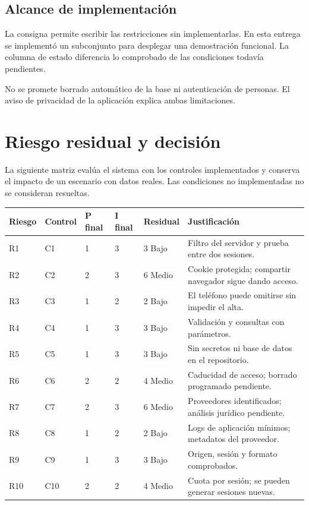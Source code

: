 \documentclass[11pt,a4paper]{article}
\begin{document}
\subsection{Alcance de implementación}
La consigna permite escribir las restricciones sin implementarlas. En esta entrega se implementó un subconjunto para desplegar una demostración funcional. La columna de estado diferencia lo comprobado de las condiciones todavía pendientes.

No se promete borrado automático de la base ni autenticación de personas. El aviso de privacidad de la aplicación explica ambas limitaciones.

\newpage
\section{Riesgo residual y decisión}
La siguiente matriz evalúa el sistema con los controles implementados y conserva el impacto de un escenario con datos reales. Las condiciones no implementadas no se consideran resueltas.

{\small
\begin{tabularx}{\textwidth}{@{}P{1cm}P{1.5cm}P{1.2cm}P{1.2cm}P{1.8cm}Y@{}}
\toprule
\textbf{Riesgo} & \textbf{Control} & \textbf{P final} & \textbf{I final} & \textbf{Residual} & \textbf{Justificación}\\
\midrule
R1 & C1 & 1 & 3 & 3 Bajo & Filtro del servidor y prueba entre dos sesiones.\\
R2 & C2 & 2 & 3 & 6 Medio & Cookie protegida; compartir navegador sigue dando acceso.\\
R3 & C3 & 1 & 2 & 2 Bajo & El teléfono puede omitirse sin impedir el alta.\\
R4 & C4 & 1 & 3 & 3 Bajo & Validación y consultas con parámetros.\\
R5 & C5 & 1 & 3 & 3 Bajo & Sin secretos ni base de datos en el repositorio.\\
R6 & C6 & 2 & 2 & 4 Medio & Caducidad de acceso; borrado programado pendiente.\\
R7 & C7 & 2 & 3 & 6 Medio & Proveedores identificados; análisis jurídico pendiente.\\
R8 & C8 & 1 & 2 & 2 Bajo & Logs de aplicación mínimos; metadatos del proveedor.\\
R9 & C9 & 1 & 3 & 3 Bajo & Origen, sesión y formato comprobados.\\
R10 & C10 & 2 & 2 & 4 Medio & Cuota por sesión; se pueden generar sesiones nuevas.\\
\bottomrule
\end{tabularx}}
\end{document}
